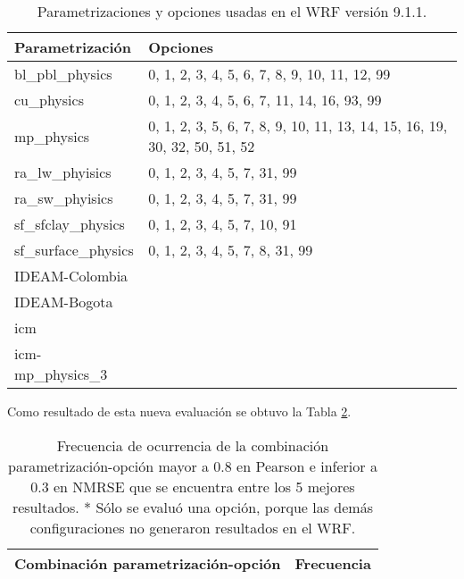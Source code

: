 \begin{itemize}


\begin{table}[H]
\caption{Parametrizaciones y opciones usadas en el WRF versión 9.1.1.}
\label{tabla_parametrizacion_opciones_2}
\begin{tabular}{lp{8cm}}
Parametrización & Opciones \\ \hline
bl\_pbl\_physics & 0, 1, 2, 3, 4, 5, 6, 7, 8, 9, 10, 11, 12, 99 \\ %
cu\_physics      & 0, 1, 2, 3, 4, 5, 6, 7, 11, 14, 16, 93, 99 \\ %
mp\_physics      & 0, 1, 2, 3, 5, 6, 7, 8, 9, 10, 11, 13, 14, 15, 16, 19, 30, 32, 50, 51, 52 \\%
ra\_lw\_phyisics & 0, 1, 2, 3, 4, 5, 7, 31, 99 \\%
ra\_sw\_phyisics & 0, 1, 2, 3, 4, 5, 7, 31, 99 \\%
sf\_sfclay\_physics & 0, 1, 2, 3, 4, 5, 7, 10, 91\\ %
sf\_surface\_physics & 0, 1, 2, 3, 4, 5, 7, 8, 31, 99\\ %
IDEAM-Colombia & \\
IDEAM-Bogota & \\ 
icm & \\ 
icm-mp_physics_3 & \\


\end{tabular}
\end{table}

Como resultado de esta nueva evaluación se obtuvo la Tabla \ref{tabla_mejores_param_opciones_2}.\\
\begin{table}[H]
\caption{Frecuencia de ocurrencia de la combinación parametrización-opción mayor a 0.8 en Pearson e inferior a 0.3 en NMRSE que se encuentra entre los 5 mejores resultados. * Sólo se evaluó una opción, porque las demás configuraciones no generaron resultados en el WRF.}
\label{tabla_mejores_param_opciones_2}
\centering
\begin{tabular}{lr}
\toprule
Combinación parametrización-opción               & Frecuencia       \\
\midrule


\end{tabular}
\end{table}
\end{itemize}
